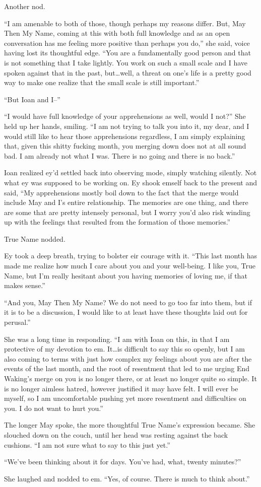 Another nod.

``I am amenable to both of those, though perhaps my reasons differ. But, May Then My Name, coming at this with both full knowledge and as an open conversation has me feeling more positive than perhaps you do,'' she said, voice having lost its thoughtful edge. ``You are a fundamentally good person and that is not something that I take lightly. You work on such a small scale and I have spoken against that in the past, but\ldots well, a threat on one's life is a pretty good way to make one realize that the small scale is still important.''

``But Ioan and I--''

``I would have full knowledge of your apprehensions as well, would I not?'' She held up her hands, smiling. ``I am not trying to talk you into it, my dear, and I would still like to hear those apprehensions regardless, I am simply explaining that, given this shitty fucking month, you merging down does not at all sound bad. I am already not what I was. There is no going and there is no back.''

Ioan realized ey'd settled back into observing mode, simply watching silently. Not what ey was supposed to be working on. Ey shook emself back to the present and said, ``My apprehensions mostly boil down to the fact that the merge would include May and I's entire relationship. The memories are one thing, and there are some that are pretty intensely personal, but I worry you'd also risk winding up with the feelings that resulted from the formation of those memories.''

True Name nodded.

Ey took a deep breath, trying to bolster eir courage with it. ``This last month has made me realize how much I care about you and your well-being. I like you, True Name, but I'm really hesitant about you having memories of loving me, if that makes sense.''

``And you, May Then My Name? We do not need to go too far into them, but if it is to be a discussion, I would like to at least have these thoughts laid out for perusal.''

She was a long time in responding. ``I am with Ioan on this, in that I am protective of my devotion to em. It\ldots is difficult to say this so openly, but I am also coming to terms with just how complex my feelings about you are after the events of the last month, and the root of resentment that led to me urging End Waking's merge on you is no longer there, or at least no longer quite so simple. It is no longer aimless hatred, however justified it may have felt. I will ever be myself, so I am uncomfortable pushing yet more resentment and difficulties on you. I do not want to hurt you.''

The longer May spoke, the more thoughtful True Name's expression became. She slouched down on the couch, until her head was resting against the back cushions. ``I am not sure what to say to this just yet.''

``We've been thinking about it for days. You've had, what, twenty minutes?''

She laughed and nodded to em. ``Yes, of course. There is much to think about.''

